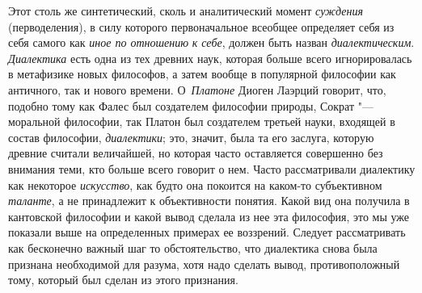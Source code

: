 {{Этот столь же синтетический, сколь и аналитический момент {\em суждения}
(перводеления), в силу которого первоначальное всеобщее
определяет себя из себя самого как
{\em иное по отношению} {\em к себе}, должен быть
назван {\em диалектическим}. {\em Диалектика} есть одна
из тех древних наук, которая больше всего игнорировалась в метафизике новых
философов, а затем вообще в популярной философии как античного, так и
нового времени. О~{\em Платоне}
Диоген Лаэрций говорит, что, подобно тому как Фалес был
создателем философии природы, Сократ "--- моральной философии,
так Платон был создателем третьей науки, входящей в состав философии,
{\em диалектики}; это,
значит, была та его заслуга, которую древние считали величайшей, но которая
часто оставляется совершенно без внимания теми, кто больше всего говорит о
нем. Часто рассматривали диалектику как некоторое {\em искусство}, как
будто она покоится на каком-то субъективном {\em таланте}, а не
принадлежит к объективности понятия. Какой вид она получила в кантовской
философии и какой вывод сделала из нее эта философия, это мы уже показали
выше на определенных примерах ее воззрений. Следует рассматривать как
бесконечно важный шаг то обстоятельство, что диалектика снова была признана
необходимой для разума, хотя надо сделать вывод, противоположный тому,
который был сделан из этого признания.

}}
